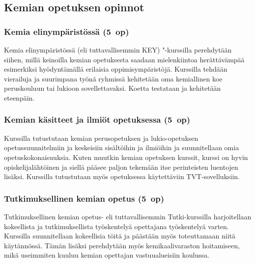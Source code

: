 \documentclass[../ala_hataile.tex]{subfiles}
\begin{document}
\subsection*{Kemian opetuksen opinnot}
\subsubsection*{Kemia elinympäristössä (5~op)}
Kemia elinympäristössä (eli tuttavallisemmin KEY) "-kurssilla perehdytään siihen, millä keinoilla kemian opetuksesta saadaan mielenkiintoa herättävämpää esimerkiksi hyödyntämällä erilaisia oppimis\-ympäristöjä. Kurssilla tehdään vierailuja ja suurimpana työnä ryhmissä kehitetään oma kemiallinen koe peruskouluun tai lukioon sovellettavaksi. Koetta testataan ja kehitetään eteenpäin.
\subsubsection*{Kemian käsitteet ja ilmiöt opetuksessa (5~op)}
Kurssilla tutustutaan kemian perus\-opetuksen ja lukio-opetuksen opetussuunnitelmiin ja keskeisiin sisältöihin ja ilmiöihin ja suunnitellaan omia opetuskokonaisuuksia. Kuten muutkin kemian opetuksen kurssit, kurssi on hyvin opiskelijalähtöinen ja siellä pääsee paljon tekemään itse perinteisten luentojen lisäksi. Kurssilla tutustutaan myös opetuksessa käytettäviin TVT-sovelluksiin.
\subsubsection*{Tutkimuksellinen kemian opetus (5~op)}
Tutkimuksellinen kemian opetus- eli tuttavallisemmin Tutki-kurssilla harjoitellaan kokeellista ja tutkimuksellista työskentelyä opettajana työskentelyä varten. Kurssilla suunnitellaan kokeellisia töitä ja päästään myös toteuttamaan niitä käytännössä. Tämän lisäksi perehdytään myös kemikaalivaraston hoitamiseen, mikä useimmiten kuuluu kemian opettajan vastuualueisiin koulussa.
\end{document}

